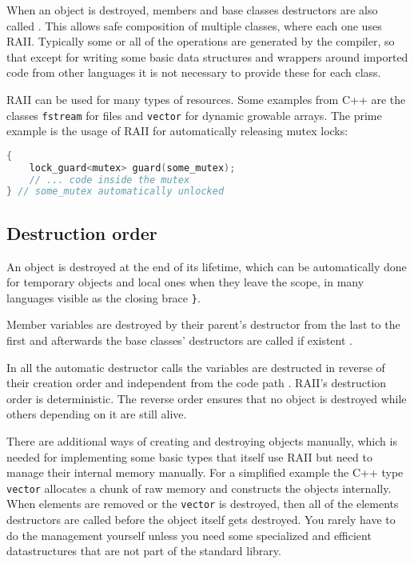\documentclass[conference,twocolumn]{IEEEtran}
\begin{document}
When an object is destroyed, members and base classes destructors are also called \cite{cpp14std}. This allows safe composition of multiple classes, where each one uses RAII.
Typically some or all of the operations are generated by the compiler, so that except for writing some basic data structures and wrappers around imported code from other languages it is not necessary to provide these for each class.

RAII can be used for many types of resources. Some examples from C++ are the classes \verb|fstream| for files and \verb|vector| for dynamic growable arrays. The prime example is the usage of RAII for automatically releasing mutex locks:
\begin{lstlisting}[language=c++, frame=single]
{
    lock_guard<mutex> guard(some_mutex);
    // ... code inside the mutex
} // some_mutex automatically unlocked
\end{lstlisting}


\subsection{Destruction order}

An object is destroyed at the end of its lifetime, which can be automatically done for temporary objects and local ones when they leave the scope, in many languages visible as the closing brace \verb|}|.

Member variables are destroyed by their parent's destructor from the last to the first and afterwards the base classes' destructors are called if existent \cite{cpp14std}.

In all the automatic destructor calls the variables are destructed in reverse of their creation order and independent from the code path \cite{cpp14std}. RAII's destruction order is deterministic. The reverse order ensures that no object is destroyed while others depending on it are still alive.

There are additional ways of creating and destroying objects manually, which is needed for implementing some basic types that itself use RAII but need to manage their internal memory manually. For a simplified example the C++ type \verb|vector| allocates a chunk of raw memory and constructs the objects internally. When elements are removed or the \verb|vector| is destroyed, then all of the elements destructors are called before the object itself gets destroyed. You rarely have to do the management yourself unless you need some specialized and efficient datastructures that are not part of the standard library.
\end{document}
